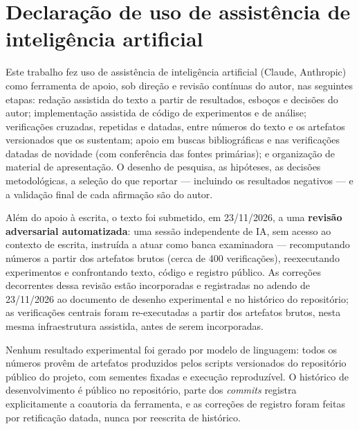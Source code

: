 \chapter*{Declaração de uso de assistência de inteligência artificial}
\thispagestyle{empty}

Este trabalho fez uso de assistência de inteligência artificial
(Claude, Anthropic) como ferramenta de apoio, sob direção e revisão
contínuas do autor, nas seguintes etapas: redação assistida do texto a
partir de resultados, esboços e decisões do autor; implementação
assistida de código de experimentos e de análise; verificações
cruzadas, repetidas e datadas, entre números do texto e os artefatos
versionados que os sustentam; apoio em buscas bibliográficas e nas
verificações datadas de novidade (com conferência das fontes
primárias); e organização de material de apresentação. O desenho de
pesquisa, as hipóteses, as decisões metodológicas, a seleção do que
reportar --- incluindo os resultados negativos --- e a validação final
de cada afirmação são do autor.

Além do apoio à escrita, o texto foi submetido, em 23/11/2026, a uma
\textbf{revisão adversarial automatizada}: uma sessão independente de
IA, sem acesso ao contexto de escrita, instruída a atuar como banca
examinadora --- recomputando números a partir dos artefatos brutos
(cerca de 400 verificações), reexecutando experimentos e confrontando
texto, código e registro público. As correções decorrentes dessa
revisão estão incorporadas e registradas no adendo de 23/11/2026 ao
documento de desenho experimental e no histórico do repositório; as
verificações centrais foram re-executadas a partir dos artefatos
brutos, nesta mesma infraestrutura assistida, antes de serem
incorporadas.

Nenhum resultado experimental foi gerado por modelo de linguagem:
todos os números provêm de artefatos produzidos pelos scripts
versionados do repositório público do projeto, com sementes fixadas e
execução reproduzível. O histórico de desenvolvimento é público no
repositório, parte dos \emph{commits} registra explicitamente a
coautoria da ferramenta, e as correções de registro foram feitas por
retificação datada, nunca por reescrita de histórico.
